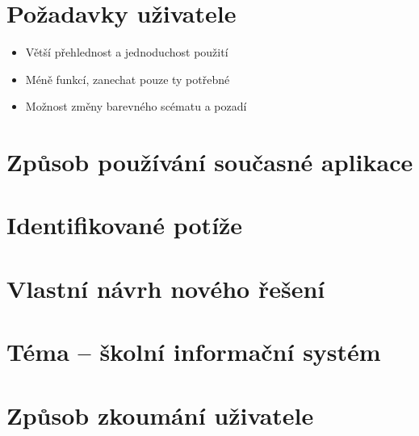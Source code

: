 \documentclass[a4paper, 11pt, twocolumn]{article}
\theoremstyle{definition}
\theoremstyle{plain}
\begin{document}
	\section*{\large{Požadavky uživatele}} 
	\vspace*{-0.2cm}
	\begin{itemize}
		\item Větší přehlednost a jednoduchost použití
		\vspace{-0.2cm}
		\item Méně funkcí, zanechat pouze ty potřebné
		\vspace{-0.2cm}
		\item Možnost změny barevného scématu a pozadí
	\end{itemize}

	\section*{\large{Způsob používání současné aplikace}}
	
	\vspace*{-0.2cm}

	\section*{\large{Identifikované potíže}}
	\vspace*{-0.2cm}

	\section*{\large{Vlastní návrh nového řešení}}
	\vspace*{-0.2cm}


	\newpage



	\section*{Téma -- školní informační systém}
	
	
	\section*{Způsob zkoumání uživatele}
\end{document}
